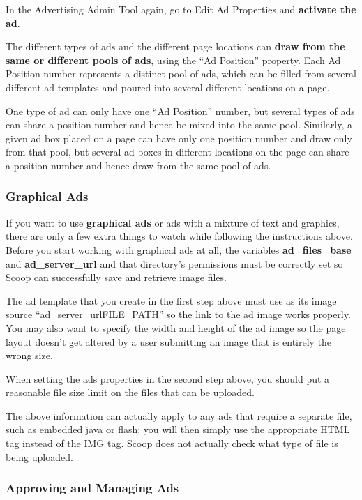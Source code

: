 In the Advertising Admin Tool again, go to Edit Ad Properties and {\bf activate the ad}.

The different types of ads and the different page locations can {\bf draw from the same or different pools of ads}, using the ``Ad Position'' property.  Each Ad Position number represents a distinct pool of ads, which can be filled from several different ad templates and poured into several different locations on a page.

One type of ad can only have one ``Ad Position'' number, but several types of ads can share a position number and hence be mixed into the same pool.  Similarly, a given ad box placed on a page can have only one position number and draw only from that pool, but several ad boxes in different locations on the page can share a position number and hence draw from the same pool of ads.  

\subsubsection{Graphical Ads}

If you want to use {\bf graphical ads} or ads with a mixture of text and graphics, there are only a few extra things to watch while following the instructions above. Before you start working with graphical ads at all, the variables {\bf ad\_files\_base} and {\bf ad\_server\_url} and that directory's permissions must be correctly set so Scoop can successfully save and retrieve image files.

The ad template that you create in the first step above must use as its image source ``\latexhtml{$\vert$}{|}ad\_server\_url\latexhtml{$\vert$$\vert$}{||}FILE\_PATH\latexhtml{$\vert$}{|}'' so the link to the ad image works properly. You may also want to specify the width and height of the ad image so the page layout doesn't get altered by a user submitting an image that is entirely the wrong size. 

When setting the ads properties in the second step above, you should put a reasonable file size limit on the files that can be uploaded.

The above information can actually apply to any ads that require a separate file, such as embedded java or flash; you will then simply use the appropriate HTML tag instead of the IMG tag. Scoop does not actually check what type of file is being uploaded.

\subsubsection{Approving and Managing Ads}

